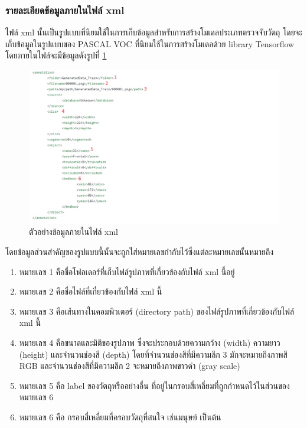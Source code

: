\subsubsection{รายละเอียดข้อมูลภายในไฟล์ xml}
\label{sec:XMLInfo}
ไฟล์ xml นั้นเป็นรูปแบบที่นิยมใช้ในการเก็บข้อมูลสำหรับการสร้างโมเดลประเภทตรวจจับวัตถุ
โดยจะเก็บข้อมูลในรูปแบบของ PASCAL VOC ที่นิยมใช้ในการสร้างโมเดลด้วย library Tensorflow โดยภายในไฟล์จะมีข้อมูลดังรูปที่ \ref{fig:XMLFormat}
\begin{figure}[!ht]
    \centering
    \includegraphics[width=1\textwidth]{chapter3/images/3_6/XMLFormat.png}
    \caption{ตัวอย่างข้อมูลภายในไฟล์ xml}
    \label{fig:XMLFormat}
\end{figure}
โดยข้อมูลส่วนสำคัญของรูปแบบนี้นั้นจะถูกใส่หมายเลขกำกับไว้ซึ่งแต่ละหมายเลขนั้นหมายถึง
\begin{enumerate}
	\setlength\itemsep{-0.25em}
    \item หมายเลข 1 คือชื่อโฟลเดอร์ที่เก็บไฟล์รูปภาพที่เกี่ยวข้องกับไฟล์ xml นี้อยู่
    \item หมายเลข 2 คือชื่อไฟล์ที่เกี่ยวข้องกับไฟล์ xml นี้
    \item หมายเลข 3 คือเส้นทางในคอมพิวเตอร์ (directory path) ของไฟล์รูปภาพที่เกี่ยวข้องกับไฟล์ xml นี้
    \item หมายเลข 4 คือขนาดและมิติของรูปภาพ ซึ่งจะประกอบด้วยความกว้าง (width) ความยาว (height) และจำนวนช่องสี (depth) 
    โดยที่จำนวนช่องสีที่มีความลึก 3 มักจะหมายถึงภาพสี RGB และจำนวนช่องสีที่มีความลึก 2 จะหมายถึงภาพขาวดำ (gray scale)
	\item หมายเลข 5 คือ label ของวัตถุหรืออย่างอื่น ที่อยู่ในกรอบสี่เหลี่ยมที่ถูกกำหนดไว้ในส่วนของหมายเลข 6
	\item หมายเลข 6 คือ กรอบสี่เหลี่ยมที่ครอบวัตถุที่สนใจ เช่นมนุษย์ เป็นต้น
\end{enumerate}